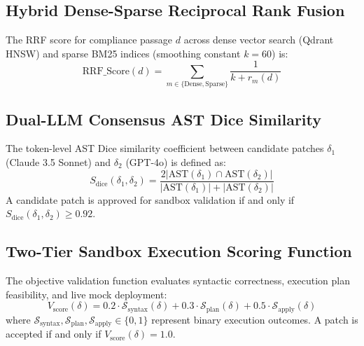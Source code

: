 \documentclass[runningheads]{llncs}
\begin{document}
\subsection{Hybrid Dense-Sparse Reciprocal Rank Fusion}
The RRF score for compliance passage $d$ across dense vector search (Qdrant HNSW) and sparse BM25 indices (smoothing constant $k = 60$) is:
\begin{equation}
\mathrm{RRF\_Score}(d) = \sum_{m \in \{\mathrm{Dense}, \mathrm{Sparse}\}} \frac{1}{k + r_m(d)}
\end{equation}

\subsection{Dual-LLM Consensus AST Dice Similarity}
The token-level AST Dice similarity coefficient between candidate patches $\delta_1$ (Claude 3.5 Sonnet) and $\delta_2$ (GPT-4o) is defined as:
\begin{equation}
S_{\mathrm{dice}}(\delta_1, \delta_2) = \frac{2 |\mathrm{AST}(\delta_1) \cap \mathrm{AST}(\delta_2)|}{|\mathrm{AST}(\delta_1)| + |\mathrm{AST}(\delta_2)|}
\end{equation}
A candidate patch is approved for sandbox validation if and only if $S_{\mathrm{dice}}(\delta_1, \delta_2) \ge 0.92$.

\subsection{Two-Tier Sandbox Execution Scoring Function}
The objective validation function evaluates syntactic correctness, execution plan feasibility, and live mock deployment:
\begin{equation}
V_{\mathrm{score}}(\delta) = 0.2 \cdot \mathcal{S}_{\mathrm{syntax}}(\delta) + 0.3 \cdot \mathcal{S}_{\mathrm{plan}}(\delta) + 0.5 \cdot \mathcal{S}_{\mathrm{apply}}(\delta)
\end{equation}
where $\mathcal{S}_{\mathrm{syntax}}, \mathcal{S}_{\mathrm{plan}}, \mathcal{S}_{\mathrm{apply}} \in \{0, 1\}$ represent binary execution outcomes. A patch is accepted if and only if $V_{\mathrm{score}}(\delta) = 1.0$.
\end{document}
